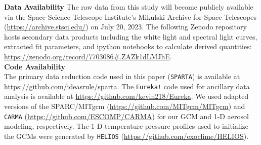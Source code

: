 \documentclass[pdflatex,sn-standardnature]{sn-jnl}%
\begin{document}

\clearpage

\noindent \textbf{Data Availability}
The raw data from this study will become publicly available via the Space Science Telescope Institute's Mikulski Archive for Space Telescopes (\url{https://archive.stsci.edu/}) on July 20, 2023. 
 The following Zenodo repository hosts secondary data products including the white light and spectral light curves, extracted fit parameters, and ipython notebooks to calculate derived quantities: \url{https://zenodo.org/record/7703086#.ZAZk1dLMJhE}.
\\

\noindent \textbf{Code Availability}\\
The primary data reduction code used in this paper (\texttt{SPARTA}) is available at \url{https://github.com/ideasrule/sparta}.  The  \texttt{Eureka!} code used for ancillary data analysis is available at \url{https://github.com/kevin218/Eureka}.  We used adapted versions of the SPARC/MITgcm (\url{https://github.com/MITgcm/MITgcm}) and \texttt{CARMA} (\url{https://github.com/ESCOMP/CARMA}) for our GCM and 1-D aerosol modeling, respectively.  The 1-D temperature-pressure profiles used to initialize the GCMs were generated by \texttt{HELIOS} (\url{https://github.com/exoclime/HELIOS}). \\ 
\end{document}
